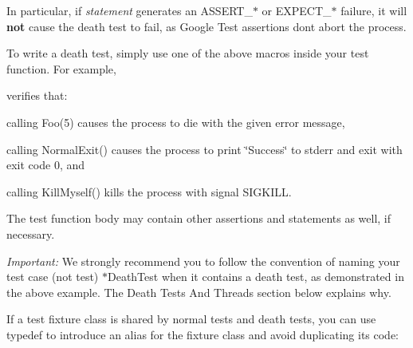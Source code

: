 In particular, if {\itshape statement} generates an {\ttfamily A\+S\+S\+E\+R\+T\+\_\+$\ast$} or {\ttfamily E\+X\+P\+E\+C\+T\+\_\+$\ast$} failure, it will {\bfseries{not}} cause the death test to fail, as Google Test assertions don\textquotesingle{}t abort the process.

To write a death test, simply use one of the above macros inside your test function. For example,


\begin{DoxyCode}{0}
\DoxyCodeLine{\}}
\DoxyCodeLine{\}}
\DoxyCodeLine{\}}
\end{DoxyCode}


verifies that\+:


\begin{DoxyItemize}
\item calling {\ttfamily Foo(5)} causes the process to die with the given error message,
\item calling {\ttfamily Normal\+Exit()} causes the process to print {\ttfamily \char`\"{}\+Success\char`\"{}} to stderr and exit with exit code 0, and
\item calling {\ttfamily Kill\+Myself()} kills the process with signal {\ttfamily S\+I\+G\+K\+I\+LL}.
\end{DoxyItemize}

The test function body may contain other assertions and statements as well, if necessary.

{\itshape Important\+:} We strongly recommend you to follow the convention of naming your test case (not test) {\ttfamily $\ast$\+Death\+Test} when it contains a death test, as demonstrated in the above example. The {\ttfamily Death Tests And Threads} section below explains why.

If a test fixture class is shared by normal tests and death tests, you can use typedef to introduce an alias for the fixture class and avoid duplicating its code\+: 
\begin{DoxyCode}{0}
\DoxyCodeLine{}
\DoxyCodeLine{}
\DoxyCodeLine{\}}
\DoxyCodeLine{}
\DoxyCodeLine{\}}
\end{DoxyCode}


